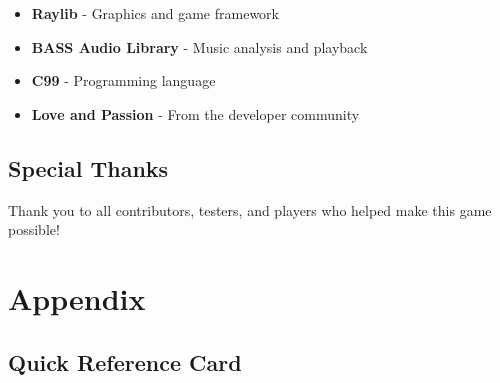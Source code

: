 \documentclass[11pt,a4paper]{article}
\begin{document}
\begin{itemize}[leftmargin=*]
    \item \textbf{Raylib} - Graphics and game framework
    \item \textbf{BASS Audio Library} - Music analysis and playback
    \item \textbf{C99} - Programming language
    \item \textbf{Love and Passion} - From the developer community
\end{itemize}

\subsection{Special Thanks}

Thank you to all contributors, testers, and players who helped make this game possible!

\section{Appendix}

\subsection{Quick Reference Card}
\end{document}
